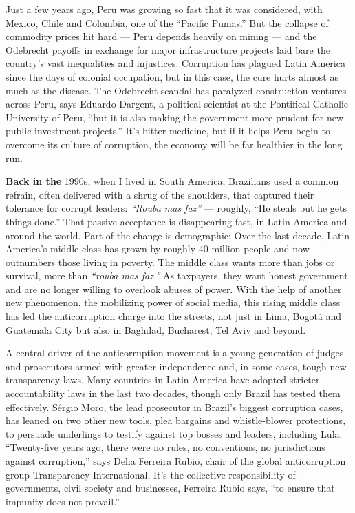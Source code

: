 Just a few years ago, Peru was growing so fast that it was considered,
with Mexico, Chile and Colombia, one of the ``Pacific Pumas.'' But the
collapse of commodity prices hit hard --- Peru depends heavily on mining
--- and the Odebrecht payoffs in exchange for major infrastructure
projects laid bare the country's vast inequalities and injustices.
Corruption has plagued Latin America since the days of colonial
occupation, but in this case, the cure hurts almost as much as the
disease. The Odebrecht scandal has paralyzed construction ventures
across Peru, says Eduardo Dargent, a political scientist at the
Pontifical Catholic University of Peru, ``but it is also making the
government more prudent for new public investment projects.'' It's
bitter medicine, but if it helps Peru begin to overcome its culture of
corruption, the economy will be far healthier in the long run.

\textbf{Back in the} 1990s, when I lived in South America, Brazilians
used a common refrain, often delivered with a shrug of the shoulders,
that captured their tolerance for corrupt leaders: \emph{``Rouba mas
faz''} --- roughly, ``He steals but he gets things done.'' That passive
acceptance is disappearing fast, in Latin America and around the world.
Part of the change is demographic: Over the last decade, Latin America's
middle class has grown by roughly 40 million people and now outnumbers
those living in poverty. The middle class wants more than jobs or
survival, more than \emph{``rouba mas faz.''} As taxpayers, they want
honest government and are no longer willing to overlook abuses of power.
With the help of another new phenomenon, the mobilizing power of social
media, this rising middle class has led the anticorruption charge into
the streets, not just in Lima, Bogotá and Guatemala City but also in
Baghdad, Bucharest, Tel Aviv and beyond.

A central driver of the anticorruption movement is a young generation of
judges and prosecutors armed with greater independence and, in some
cases, tough new transparency laws. Many countries in Latin America have
adopted stricter accountability laws in the last two decades, though
only Brazil has tested them effectively. Sérgio Moro, the lead
prosecutor in Brazil's biggest corruption cases, has leaned on two other
new tools, plea bargains and whistle-blower protections, to persuade
underlings to testify against top bosses and leaders, including Lula.
``Twenty-five years ago, there were no rules, no conventions, no
jurisdictions against corruption,'' says Delia Ferreira Rubio, chair of
the global anticorruption group Transparency International. It's the
collective responsibility of governments, civil society and businesses,
Ferreira Rubio says, ``to ensure that impunity does not prevail.''

